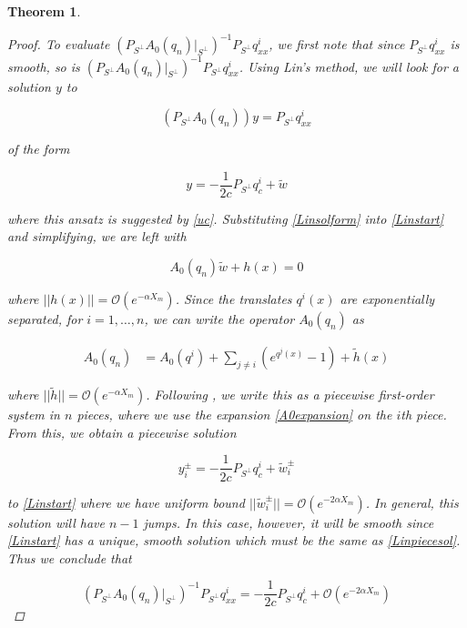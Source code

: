 \documentclass[12pt]{article}
\newtheorem{theorem}{Theorem}
\begin{document}
\begin{theorem}
\begin{proof}
To evaluate $(P_{S^\perp} A_0(q_n)|_{S^\perp})^{-1} P_{S^\perp} q^i_{xx}$, we first note that since $P_{S^\perp} q^i_{xx}$ is smooth, so is $(P_{S^\perp} A_0(q_n)|_{S^\perp})^{-1} P_{S^\perp} q^i_{xx}$. Using Lin's method, we will look for a solution $y$ to 

\begin{equation}\label{Linstart}
(P_{S^\perp} A_0(q_n))y = P_{S^\perp} q^i_{xx}
\end{equation}

of the form 

\begin{equation}\label{Linsolform}
y = -\frac{1}{2c} P_{S^\perp} q^i_c + \tilde{w}
\end{equation}

where this ansatz is suggested by \eqref{uc}. Substituting \eqref{Linsolform} into \eqref{Linstart} and simplifying, we are left with

\begin{equation}
A_0(q_n)\tilde{w} + h(x) = 0
\end{equation}

where $||h(x)|| = \mathcal{O}(e^{-\alpha X_m})$. Since the translates $q^i(x)$ are exponentially separated, for $i = 1, \dots, n$, we can write the operator $A_0(q_n)$ as 

\begin{align}\label{A0expansion} 
A_0(q_n) &= A_0(q^i) + \sum_{j \neq i} (e^{q^j(x)} - 1) + \tilde{h}(x)
\end{align}

where $||\tilde{h}|| = \mathcal{O}(e^{-\alpha X_m})$. Following \cite{Sandstede1998}, we write this as a piecewise first-order system in $n$ pieces, where we use the expansion \eqref{A0expansion} on the $i$th piece. From this, we obtain a piecewise solution 

\begin{equation}\label{Linpiecesol}
y_i^\pm = -\frac{1}{2c} P_{S^\perp} q^i_c + \tilde{w}_i^\pm
\end{equation}

to \eqref{Linstart} where we have uniform bound $||\tilde{w}_i^\pm|| = \mathcal{O}(e^{-2 \alpha X_m})$. In general, this solution will have $n - 1$ jumps. In this case, however, it will be smooth since \eqref{Linstart} has a unique, smooth solution which must be the same as \eqref{Linpiecesol}. Thus we conclude that 

\begin{equation}\label{invqxx}
(P_{S^\perp} A_0(q_n)|_{S^\perp})^{-1} P_{S^\perp} q^i_{xx} = -\frac{1}{2c}P_{S^\perp} q^i_c
+ \mathcal{O}(e^{-2 \alpha X_m})
\end{equation}


\end{proof}
\end{theorem}
\end{document}
